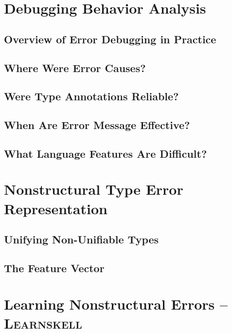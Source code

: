 \documentclass[12pt]{report}	%
\newcommand{\newCompiler}{\textsc{Learnskell}}
\begin{document}
\chapter{Debugging Behavior Analysis}
\label{sec:analysis}

\section{Overview of Error Debugging in Practice}
\label{sec:overview}

\section{Where Were Error Causes?}
\label{sec:causes}

\section{Were Type Annotations Reliable?}
\label{sec:annotation}

\section{When Are Error Message Effective?}
\label{sec:effectiveness}

\section{What Language Features Are Difficult?}
\label{sec:difficulty}

\chapter{Nonstructural Type Error Representation}
\label{sec:features}

\section{Unifying Non-Unifiable Types}
\label{sec:features:unify}

\section{The Feature Vector}
\label{sec:features:feature}

\chapter{Learning Nonstructural Errors -- \newCompiler}
\label{sec:solution}
\end{document}
